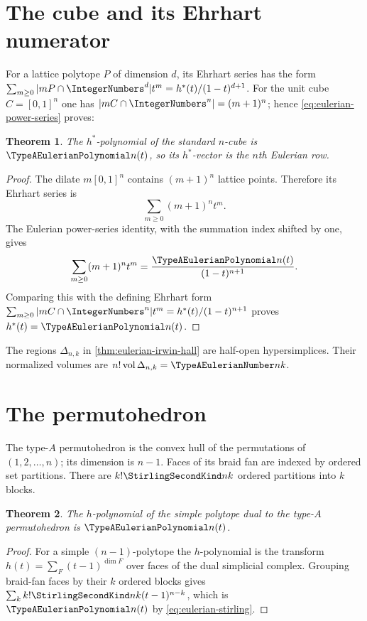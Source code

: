 \documentclass[11pt,a4paper,oneside,openany]{book}
\newtheorem{theorem}{Theorem}[chapter]
\theoremstyle{definition}
\theoremstyle{remark}
\begin{document}
\section{The cube and its Ehrhart numerator}
For a lattice polytope $P$ of dimension $d$, its Ehrhart series has the form
$\sum_{m\ge0}|mP\cap\IntegerNumbers^d|t^m=h^*(t)/(1-t)^{d+1}$.
For the unit cube $C=[0,1]^n$ one has $|mC\cap\IntegerNumbers^n|=(m+1)^n$; hence
\eqref{eq:eulerian-power-series} proves:
\begin{theorem}\label{unif:thm-cube-ehrhart}
The $h^*$-polynomial of the standard $n$-cube is $\TypeAEulerianPolynomial n(t)$, so its $h^*$-vector is
the $n$th Eulerian row.
\end{theorem}
\begin{proof}
The dilate $m[0,1]^n$ contains $(m+1)^n$ lattice points. Therefore its Ehrhart
series is
\[
 \sum_{m\ge0}(m+1)^nt^m.
\]
The Eulerian power-series identity, with the summation index shifted by one,
gives
\[
 \sum_{m\ge0}(m+1)^nt^m=\frac{\TypeAEulerianPolynomial n(t)}{(1-t)^{n+1}}.
\]
Comparing this with the defining Ehrhart form
$\sum_{m\ge0}|mC\cap\IntegerNumbers^n|t^m=h^*(t)/(1-t)^{n+1}$ proves
$h^*(t)=\TypeAEulerianPolynomial n(t)$.
\end{proof}

The regions $\Delta_{n,k}$ in \cref{thm:eulerian-irwin-hall} are half-open
hypersimplices.  Their normalized volumes are $n!\operatorname{vol}\Delta_{n,k}
=\TypeAEulerianNumber nk$.

\section{The permutohedron}
The type-$A$ permutohedron is the convex hull of the permutations of
$(1,2,\ldots,n)$; its dimension is $n-1$.  Faces of its braid fan are indexed by
ordered set partitions.  There are $k!\StirlingSecondKind nk$ ordered partitions into $k$
blocks.

\begin{theorem}
The $h$-polynomial of the simple polytope dual to the type-$A$ permutohedron is
$\TypeAEulerianPolynomial n(t)$.
\end{theorem}
\begin{proof}
For a simple $(n-1)$-polytope the $h$-polynomial is the transform
$h(t)=\sum_F(t-1)^{\dim F}$ over faces of the dual simplicial complex.  Grouping
braid-fan faces by their $k$ ordered blocks gives
$\sum_k k!\StirlingSecondKind nk(t-1)^{n-k}$, which is $\TypeAEulerianPolynomial n(t)$ by
\eqref{eq:eulerian-stirling}.
\end{proof}
\end{document}
